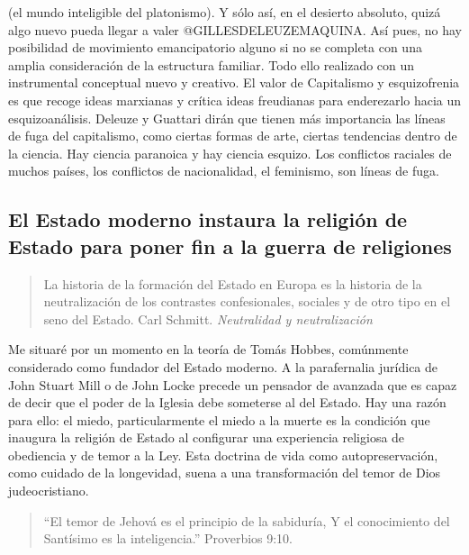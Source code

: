 \documentclass[
]{article}
\begin{document}
(el mundo inteligible del platonismo). Y sólo así, en el desierto
absoluto, quizá algo nuevo pueda llegar a valer @GILLESDELEUZEMAQUINA.
Así pues, no hay posibilidad de movimiento emancipatorio alguno si no se
completa con una amplia consideración de la estructura familiar. Todo
ello realizado con un instrumental conceptual nuevo y creativo. El valor
de Capitalismo y esquizofrenia es que recoge ideas marxianas y crítica
ideas freudianas para enderezarlo hacia un esquizoanálisis. Deleuze y
Guattari dirán que tienen más importancia las líneas de fuga del
capitalismo, como ciertas formas de arte, ciertas tendencias dentro de
la ciencia. Hay ciencia paranoica y hay ciencia esquizo. Los conflictos
raciales de muchos países, los conflictos de nacionalidad, el feminismo,
son líneas de fuga.

\hypertarget{el-estado-moderno-instaura-la-religiuxf3n-de-estado-para-poner-fin-a-la-guerra-de-religiones}{%
\subsection{El Estado moderno instaura la religión de Estado para poner
fin a la guerra de
religiones}\label{el-estado-moderno-instaura-la-religiuxf3n-de-estado-para-poner-fin-a-la-guerra-de-religiones}}

\begin{quote}
La historia de la formación del Estado en Europa es la historia de la
neutralización de los contrastes confesionales, sociales y de otro tipo
en el seno del Estado. Carl Schmitt. \emph{Neutralidad y neutralización}
\end{quote}

Me situaré por un momento en la teoría de Tomás Hobbes, comúnmente
considerado como fundador del Estado moderno. A la parafernalia jurídica
de John Stuart Mill o de John Locke precede un pensador de avanzada que
es capaz de decir que el poder de la Iglesia debe someterse al del
Estado. Hay una razón para ello: el miedo, particularmente el miedo a la
muerte es la condición que inaugura la religión de Estado al configurar
una experiencia religiosa de obediencia y de temor a la Ley. Esta
doctrina de vida como autopreservación, como cuidado de la longevidad,
suena a una transformación del temor de Dios judeocristiano.

\begin{quote}
``El temor de Jehová es el principio de la sabiduría, Y el conocimiento
del Santísimo es la inteligencia.'' Proverbios 9:10.
\end{quote}
\end{document}
